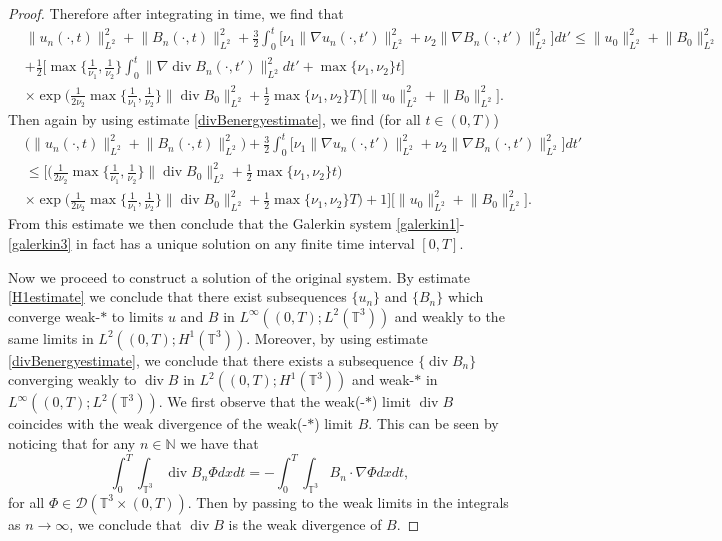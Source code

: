 \documentclass[12pt,a4paper]{article}
\theoremstyle{definition}
\theoremstyle{remark}
\numberwithin{equation}{section}
\DeclareMathOperator{\Div}{div}
\begin{document}
\begin{proof}
Therefore after integrating in time, we find that
\begin{align*}
&\lVert u_n (\cdot, t) \rVert_{L^2}^2 + \lVert B_n (\cdot, t) \rVert_{L^2}^2 + \frac{3}{2} \int_0^t \bigg[ \nu_1 \lVert \nabla u_n (\cdot, t') \rVert_{L^2}^2 + \nu_2 \lVert \nabla B_n (\cdot, t') \rVert_{L^2}^2 \bigg] dt' \leq \lVert u_0 \rVert_{L^2}^2 + \lVert B_0 \rVert_{L^2}^2 \\
&+\frac{1}{2} \bigg[ \max \bigg\{ \frac{1}{\nu_1}, \frac{1}{\nu_2} \bigg\} \int_0^t \lVert \nabla \Div B_n (\cdot, t') \rVert_{L^2}^2 dt' + \max \{ \nu_1, \nu_2 \} t \bigg] \\
&\times \exp \bigg( \frac{1}{2 \nu_2} \max \bigg\{ \frac{1}{\nu_1}, \frac{1}{\nu_2} \bigg\} \lVert \Div B_{0} \rVert_{L^2}^2 + \frac{1}{2} \max \{ \nu_1, \nu_2 \} T \bigg) \bigg[ \lVert u_{0} \rVert_{L^2}^2 + \lVert B_{0} \rVert_{L^2}^2 \bigg].
\end{align*}
Then again by using estimate \eqref{divBenergyestimate}, we find (for all $t \in (0,T)$)
\begin{align}
&\big( \lVert u_n (\cdot, t) \rVert_{L^2}^2 + \lVert B_n (\cdot, t) \rVert_{L^2}^2 \big) + \frac{3}{2} \int_0^t \bigg[ \nu_1 \lVert \nabla u_n (\cdot, t') \rVert_{L^2}^2 + \nu_2 \lVert \nabla B_n (\cdot, t') \rVert_{L^2}^2 \bigg] dt' \nonumber \\
&\leq\bigg[ \bigg(\frac{1}{2 \nu_2} \max \bigg\{ \frac{1}{\nu_1}, \frac{1}{\nu_2} \bigg\} \lVert \Div B_{0} \rVert_{L^2}^2 + \frac{1}{2} \max \{ \nu_1, \nu_2 \} t \bigg) \nonumber \\
&\times \exp \bigg( \frac{1}{2 \nu_2} \max \bigg\{ \frac{1}{\nu_1}, \frac{1}{\nu_2} \bigg\} \lVert \Div B_{0} \rVert_{L^2}^2 + \frac{1}{2} \max \{ \nu_1, \nu_2 \} T \bigg) + 1\bigg] \bigg[ \lVert u_{0} \rVert_{L^2}^2 + \lVert B_{0} \rVert_{L^2}^2 \bigg]. \label{H1estimate}
\end{align}
From this estimate we then conclude that the Galerkin system \eqref{galerkin1}-\eqref{galerkin3} in fact has a unique solution on any finite time interval $[0,T]$. 

Now we proceed to construct a solution of the original system. By estimate \eqref{H1estimate} we conclude that there exist subsequences $\{ u_n \}$ and $\{ B_n \}$ which converge weak-$*$ to limits $u$ and $B$ in $L^\infty ((0,T); L^2 (\mathbb{T}^3))$ and weakly to the same limits in $L^2 ((0,T); H^1 (\mathbb{T}^3))$. Moreover, by using estimate \eqref{divBenergyestimate}, we conclude that there exists a subsequence $\{ \Div B_n \}$ converging weakly to $\Div B$ in $L^2 ((0,T); H^1 (\mathbb{T}^3))$ and weak-$*$ in $L^\infty ((0,T); L^2 (\mathbb{T}^3))$. We first observe that the weak(-$*$) limit $\Div B$ coincides with the weak divergence of the weak(-$*$) limit $B$. This can be seen by noticing that for any $n \in \mathbb{N}$ we have that
\begin{equation*}
\int_0^T \int_{\mathbb{T}^3} \Div B_n \Phi dx dt = - \int_0^T \int_{\mathbb{T}^3} B_n \cdot \nabla \Phi dx dt,
\end{equation*}
for all $\Phi \in \mathcal{D} (\mathbb{T}^3 \times (0,T))$. Then by passing to the weak limits in the integrals as $n \rightarrow \infty$, we conclude that $\Div B$ is the weak divergence of $B$.


\end{proof}
\end{document}
